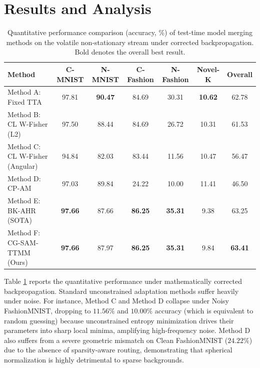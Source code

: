 \documentclass{article}
\theoremstyle{plain}
\theoremstyle{definition}
\theoremstyle{remark}
\begin{document}
\section{Results and Analysis}
\label{sec:results}

\begin{table}[t]
\caption{Quantitative performance comparison (accuracy, \%) of test-time model merging methods on the volatile non-stationary stream under corrected backpropagation. Bold denotes the overall best result.}
\label{tab:results}
\vskip 0.15in
\begin{center}
\begin{small}
\begin{sc}
\begin{tabular}{lcccccc}
\toprule
Method & C-MNIST & N-MNIST & C-Fashion & N-Fashion & Novel-K & Overall \\
\midrule
Method A: Fixed TTA & 97.81 & \textbf{90.47} & 84.69 & 30.31 & \textbf{10.62} & 62.78 \\
Method B: CL W-Fisher (L2) & 97.50 & 88.44 & 84.69 & 26.72 & 10.31 & 61.53 \\
Method C: CL W-Fisher (Angular) & 94.84 & 82.03 & 83.44 & 11.56 & 10.47 & 56.47 \\
Method D: CP-AM & 97.03 & 89.84 & 24.22 & 10.00 & 11.41 & 46.50 \\
Method E: BK-AHR (SOTA) & \textbf{97.66} & 87.66 & \textbf{86.25} & \textbf{35.31} & 9.38 & 63.25 \\
\midrule
Method F: CG-SAM-TTMM (Ours) & \textbf{97.66} & 87.97 & \textbf{86.25} & \textbf{35.31} & 9.84 & \textbf{63.41} \\
\bottomrule
\end{tabular}
\end{sc}
\end{small}
\end{center}
\vskip -0.1in
\end{table}

Table \ref{tab:results} reports the quantitative performance under mathematically corrected backpropagation.
Standard unconstrained adaptation methods suffer heavily under noise. For instance, Method C and Method D collapse under Noisy FashionMNIST, dropping to $11.56\%$ and $10.00\%$ accuracy (which is equivalent to random guessing) because unconstrained entropy minimization drives their parameters into sharp local minima, amplifying high-frequency noise. Method D also suffers from a severe geometric mismatch on Clean FashionMNIST ($24.22\%$) due to the absence of sparsity-aware routing, demonstrating that spherical normalization is highly detrimental to sparse backgrounds.
\end{document}
